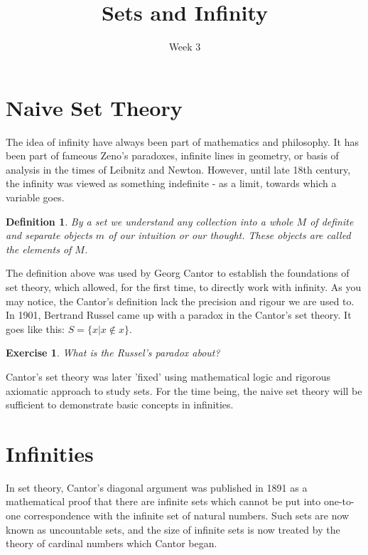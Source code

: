 \documentclass[11pt,a5paper]{article}
\title{\textbf{Sets and Infinity}}
\date{Week 3}
\newtheorem{definition}{Definition}
\newtheorem{exercise}{Exercise}
\begin{document}
\maketitle




\section{Naive Set Theory}

The idea of infinity have always been part of mathematics and philosophy. It has been part of fameous Zeno's paradoxes, infinite lines in geometry, or basis of analysis in the times of Leibnitz and Newton. However, until late 18th century, the infinity was viewed as something indefinite - as a limit, towards which a variable goes.

\begin{definition}
By a \emph{set} we understand any collection into a whole $M$ of definite and separate objects $m$ of our intuition or our thought. These objects are called the \emph{elements} of $M$.
\end{definition}

\noindent The definition above was used by Georg Cantor to establish the foundations of set theory, which allowed, for the first time, to directly work with infinity. As you may notice, the Cantor's definition lack the precision and rigour we are used to. In 1901, Bertrand Russel came up with a paradox in the Cantor's set theory. It goes like this: $S=\{x|x\notin x\}$.

\begin{exercise} What is the Russel's paradox about?
\end{exercise}

\noindent Cantor's set theory was later 'fixed' using mathematical logic and rigorous axiomatic approach to study sets. For the time being, the naive set theory will be sufficient to demonstrate basic concepts in infinities.

\section{Infinities}

\noindent In set theory, Cantor's diagonal argument was published in 1891 as a mathematical proof that there are infinite sets which cannot be put into one-to-one correspondence with the infinite set of natural numbers. Such sets are now known as uncountable sets, and the size of infinite sets is now treated by the theory of cardinal numbers which Cantor began. 
\end{document}
